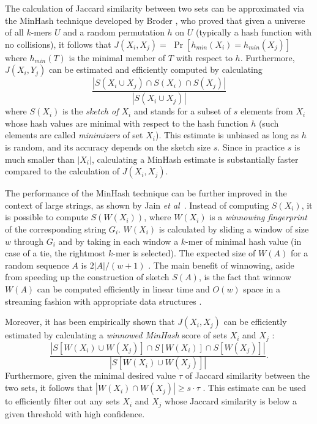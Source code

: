 \documentclass{article}
\begin{document}
The calculation of Jaccard similarity between two sets can be approximated via the MinHash technique developed by Broder \citep{Broder1997}, who proved that given a universe of all $k$-mers $U$ and a random permutation $h$ on $U$ (typically a  hash function with no collisions), it follows that
$J(X_i,X_j) = $ $\Pr \left[ h_{min} (X_i) = h_{min} (X_j)\right]$ where $h_{min}(T)$ is the minimal member of $T$ with respect to $h$.
Furthermore,  $J(X_i,Y_j)$ can be estimated and efficiently computed by calculating
$$\frac{\left|S(X_i \cup X_j) \cap S(X_i) \cap S(X_j)\right|}{\left|S(X_i \cup X_j)\right|}$$
where $S(X_i)$ is the \emph{sketch of $X_i$} and stands for a subset of $s$ elements from $X_i$ whose hash values are minimal with respect to the hash function $h$ (such elements are called \emph{minimizers} of set $X_i$). This estimate is unbiased as long as $h$ is random, and its accuracy depends on the sketch size $s$. Since in practice $s$ is much smaller than $|X_i|$, calculating a MinHash estimate is substantially faster compared to the calculation of $J(X_i,X_j)$. 

The performance of the MinHash technique can be further improved in the context of large strings, as shown by Jain \emph{et al}~\citep{Jain2017a}.
Instead of computing $S(X_i)$, it is possible to compute $S(W({X}_i))$, where $W({X}_i)$ is a \emph{winnowing fingerprint} of the corresponding string $G_i$. $W({X}_i)$ is calculated by sliding a window of size $w$ through $G_i$ and by taking in each window a $k$-mer of minimal hash value (in case of a tie, the rightmost $k$-mer is selected). The expected size of $W(A)$ for a random sequence $A$ is $2|A|/(w+1)$ \citep{Schleimer2003}. The main benefit of winnowing, aside from speeding up the construction of sketch $S(A)$, is the fact that winnow $W(A)$ can be computed efficiently in linear time and $O(w)$ space in a streaming fashion with appropriate data structures \citep{SmithWW}.

Moreover, it has been empirically shown that $J(X_i,X_j)$ can be efficiently estimated by calculating a \emph{winnowed MinHash} score of sets $X_i$ and $X_j$ \citep{Jain2017a}:
$$\frac{|S\left[W({X}_i) \cup W({X}_j)\right] \cap S\left[W({X}_i)\right] \cap S\left[W({X}_j)\right]|}{|S\left[W({X}_i) \cup W({X}_j)\right]|}.$$
Furthermore, given the minimal desired value $\tau$ of Jaccard similarity between the two sets,
it follows that $|W({X}_i) \cap W({X}_j)| \geq s \cdot \tau$ \citep{Jain2017a}. This estimate can be used to efficiently filter out any sets $X_i$ and $X_j$ whose Jaccard similarity is below a given threshold with high confidence.
\end{document}
